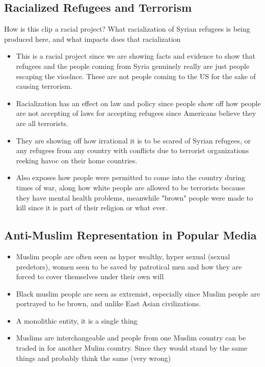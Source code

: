\documentclass{article}
\begin{document}
\subsection{Racialized Refugees and Terrorism}
  How is this clip a racial project? What racialization of Syrian
  refugees is being produced here, and what impacts does that racialization
\begin{itemize}
  \item This is a racial project since we are showing facts and evidence to show that
    refugees and the people coming from Syria genuinely really are just people
    escaping the vioelnce. These are not people coming to the US for the sake of
    causing terrorism.
  \item Racialization has an effect on law and policy since people show off how people
    are not accepting of laws for accepting refugees since
    Americans believe they are all terrorists.
  \item They are showing off how irrational it is to be scared of Syrian refugees,
    or any refugees from any country with conflicts due to terrorist organizations
    reeking havoc on their home countries.
  \item Also exposes how people were permitted to come into the country during times of war,
    along how white people are allowed to be terrorists because they have
    mental health problems, meanwhile "brown" people were made to kill
    since it is part of their religion or what ever.
\end{itemize}

\subsection{Anti-Muslim Representation in Popular Media}
\begin{itemize}
  \item Muslim people are often seen as hyper wealthy,
    hyper sexual (sexual predetors), women seen to be saved by patrotical
    men and how they are forced to cover themselves under their own will
  \item Black muslim people are seen as extremist,
    especially since Muslim people are portrayed to be brown, and unlike East Asian civilizations.
  \item A monolithic entity, it is a single thing
  \item Muslims are interchangeable and people from one Muslim country can be traded in for another
    Mulim country. Since they would stand by the same things and probably think the same (very wrong)
\end{itemize}
\end{document}
